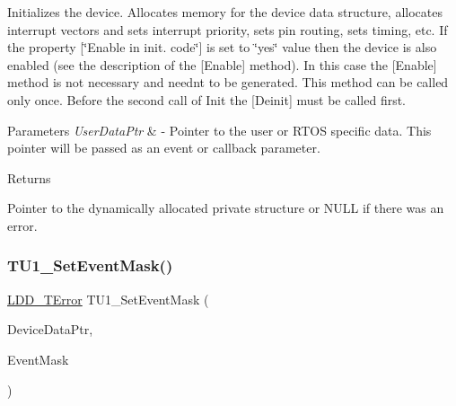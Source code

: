Initializes the device. Allocates memory for the device data structure, allocates interrupt vectors and sets interrupt priority, sets pin routing, sets timing, etc. If the property \mbox{[}\char`\"{}\+Enable in init. code\char`\"{}\mbox{]} is set to \char`\"{}yes\char`\"{} value then the device is also enabled (see the description of the \mbox{[}Enable\mbox{]} method). In this case the \mbox{[}Enable\mbox{]} method is not necessary and needn\textquotesingle{}t to be generated. This method can be called only once. Before the second call of Init the \mbox{[}Deinit\mbox{]} must be called first. 


\begin{DoxyParams}{Parameters}
{\em User\+Data\+Ptr} & -\/ Pointer to the user or R\+T\+OS specific data. This pointer will be passed as an event or callback parameter. \\
\hline
\end{DoxyParams}
\begin{DoxyReturn}{Returns}

\begin{DoxyItemize}
\item Pointer to the dynamically allocated private structure or N\+U\+LL if there was an error. 
\end{DoxyItemize}
\end{DoxyReturn}
\mbox{\label{group___t_u1__module_ga0e3a03c2724bd7f8b64d8dd2c8796fd2}} 
\subsubsection{\texorpdfstring{T\+U1\+\_\+\+Set\+Event\+Mask()}{TU1\_SetEventMask()}}
{\footnotesize\ttfamily \hyperlink{group___p_e___types__module_ga24c2b045fd04e79e85f261ce4df35588}{L\+D\+D\+\_\+\+T\+Error} T\+U1\+\_\+\+Set\+Event\+Mask (\begin{DoxyParamCaption}\item[{\hyperlink{group___p_e___types__module_gac5cf1362f1f0e3a2ce71b1bf2276d091}{L\+D\+D\+\_\+\+T\+Device\+Data} $\ast$}]{Device\+Data\+Ptr,  }\item[{\hyperlink{group___p_e___types__module_gafbe7f4d4e51560399c3bdd0218584533}{L\+D\+D\+\_\+\+T\+Event\+Mask}}]{Event\+Mask }\end{DoxyParamCaption})}



